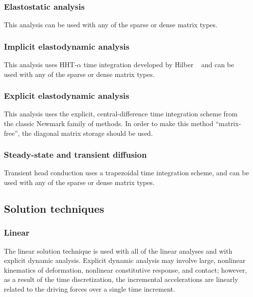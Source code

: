 \subsubsection{Elastostatic analysis}
This analysis can be used with any of the sparse or dense matrix types.

\subsubsection{Implicit elastodynamic analysis}
This analysis uses HHT-$\alpha$ time integration developed by Hilber 
\etal~\cite{Hughes1977} and can be used with any of the sparse or dense
matrix types.

\subsubsection{Explicit elastodynamic analysis}
This analysis uses the explicit, central-difference time integration scheme
from the classic Newmark family of methods. In order to make this method
``matrix-free'', the diagonal matrix storage should be used.

\subsubsection{Steady-state and transient diffusion}
Transient head conduction uses a trapezoidal time integration scheme, and
can be used with any of the sparse or dense matrix types.

\subsection{Solution techniques}

\subsubsection{Linear}
The linear solution technique is used with all of the linear analyses and
with explicit dynamic analysis.  Explicit dynamic analysis may involve
large, nonlinear kinematics of deformation, nonlinear constitutive
response, and contact; however, as a result of the time discretization, the
incremental accelerations are linearly related to the driving forces over a
single time increment.

